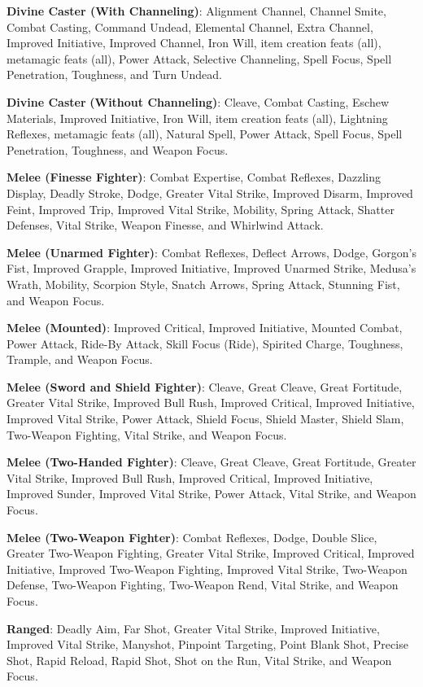 \textbf{Divine Caster (With Channeling)}: Alignment Channel, Channel Smite, Combat Casting, Command Undead, Elemental Channel, Extra Channel, Improved Initiative, Improved Channel, Iron Will, item creation feats (all), metamagic feats (all), Power Attack, Selective Channeling, Spell Focus, Spell Penetration, Toughness, and Turn Undead.
				
\textbf{Divine Caster} \textbf{(Without Channeling)}: Cleave, Combat Casting, Eschew Materials, Improved Initiative, Iron Will, item creation feats (all), Lightning Reflexes, metamagic feats (all), Natural Spell, Power Attack, Spell Focus, Spell Penetration, Toughness, and Weapon Focus.
				
\textbf{Melee (Finesse Fighter)}: Combat Expertise, Combat Reflexes, Dazzling Display, Deadly Stroke, Dodge, Greater Vital Strike, Improved Disarm, Improved Feint, Improved Trip, Improved Vital Strike, Mobility, Spring Attack, Shatter Defenses, Vital Strike, Weapon Finesse, and Whirlwind Attack.
				
\textbf{Melee (Unarmed Fighter)}: Combat Reflexes, Deflect Arrows, Dodge, Gorgon's Fist, Improved Grapple, Improved Initiative, Improved Unarmed Strike, Medusa's Wrath, Mobility, Scorpion Style, Snatch Arrows, Spring Attack, Stunning Fist, and Weapon Focus.
				
\textbf{Melee (Mounted)}: Improved Critical, Improved Initiative, Mounted Combat, Power Attack, Ride-By Attack, Skill Focus (Ride), Spirited Charge, Toughness, Trample, and Weapon Focus.
				
\textbf{Melee (Sword and Shield Fighter)}: Cleave, Great Cleave, Great Fortitude, Greater Vital Strike, Improved Bull Rush, Improved Critical, Improved Initiative, Improved Vital Strike, Power Attack, Shield Focus, Shield Master, Shield Slam, Two-Weapon Fighting, Vital Strike, and Weapon Focus.
				
\textbf{Melee (Two-Handed Fighter)}: Cleave, Great Cleave, Great Fortitude, Greater Vital Strike, Improved Bull Rush, Improved Critical, Improved Initiative, Improved Sunder, Improved Vital Strike, Power Attack, Vital Strike, and Weapon Focus.
				
\textbf{Melee (Two-Weapon Fighter)}: Combat Reflexes, Dodge, Double Slice, Greater Two-Weapon Fighting, Greater Vital Strike, Improved Critical, Improved Initiative, Improved Two-Weapon Fighting, Improved Vital Strike, Two-Weapon Defense, Two-Weapon Fighting, Two-Weapon Rend, Vital Strike, and Weapon Focus.
				
\textbf{Ranged}: Deadly Aim, Far Shot, Greater Vital Strike, Improved Initiative, Improved Vital Strike, Manyshot, Pinpoint Targeting, Point Blank Shot, Precise Shot, Rapid Reload, Rapid Shot, Shot on the Run, Vital Strike, and Weapon Focus.
				
